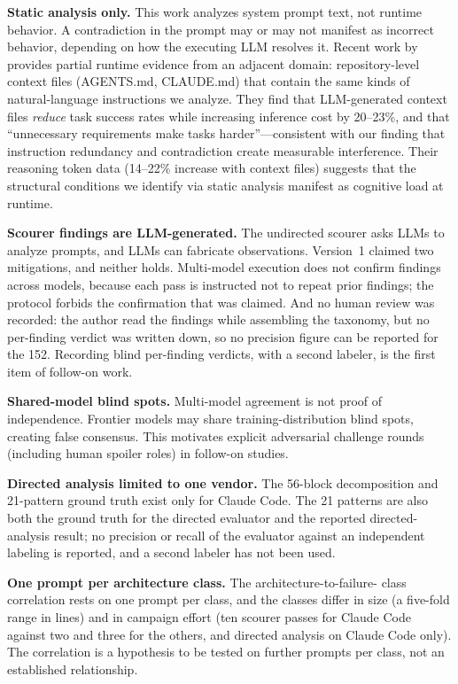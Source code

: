\documentclass[11pt,a4paper]{article}
\begin{document}
\textbf{Static analysis only.} This work analyzes system prompt text,
not runtime behavior. A contradiction in the prompt may or may not
manifest as incorrect behavior, depending on how the executing LLM
resolves it. Recent work by~\citet{gloaguen2026evaluating} provides
partial runtime evidence from an adjacent domain: repository-level
context files (AGENTS.md, CLAUDE.md) that contain the same kinds of
natural-language instructions we analyze. They find that LLM-generated
context files \emph{reduce} task success rates while increasing
inference cost by 20--23\%, and that ``unnecessary requirements make
tasks harder''---consistent with our finding that instruction
redundancy and contradiction create measurable interference. Their
reasoning token data (14--22\% increase with context files) suggests
that the structural conditions we identify via static analysis
manifest as cognitive load at runtime.

\textbf{Scourer findings are LLM-generated.} The undirected scourer
asks LLMs to analyze prompts, and LLMs can fabricate observations.
Version~1 claimed two mitigations, and neither holds. Multi-model
execution does not confirm findings across models, because each pass
is instructed not to repeat prior findings; the protocol forbids the
confirmation that was claimed. And no human review was recorded: the
author read the findings while assembling the taxonomy, but no
per-finding verdict was written down, so no precision figure can be
reported for the 152. Recording blind per-finding verdicts, with a
second labeler, is the first item of follow-on work.

\textbf{Shared-model blind spots.} Multi-model agreement is not proof of
independence. Frontier models may share training-distribution blind
spots, creating false consensus. This motivates explicit adversarial
challenge rounds (including human spoiler roles) in follow-on studies.

\textbf{Directed analysis limited to one vendor.} The 56-block
decomposition and 21-pattern ground truth exist only for Claude Code.
The 21 patterns are also both the ground truth for the directed
evaluator and the reported directed-analysis result; no precision or
recall of the evaluator against an independent labeling is reported,
and a second labeler has not been used.

\textbf{One prompt per architecture class.} The architecture-to-failure-
class correlation rests on one prompt per class, and the classes differ
in size (a five-fold range in lines) and in campaign effort (ten
scourer passes for Claude Code against two and three for the others,
and directed analysis on Claude Code only). The correlation is a
hypothesis to be tested on further prompts per class, not an
established relationship.
\end{document}
